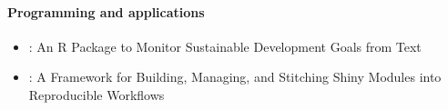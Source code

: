 \paragraph{Programming and applications}\label{programming-and-applications}

\begin{itemize}
\tightlist
\item
  : An R Package to Monitor Sustainable Development Goals from Text
\item
  : A Framework for Building, Managing, and Stitching Shiny Modules into Reproducible Workflows
\end{itemize}


\address{%
Mark P.J. van der Loo\\
Statistics Netherlands and Leiden University\\%
\\
%
\url{https://journal.r-project.org}\\%
%
\href{mailto:r-journal@r-project.org}{\nolinkurl{r-journal@r-project.org}}%
}
